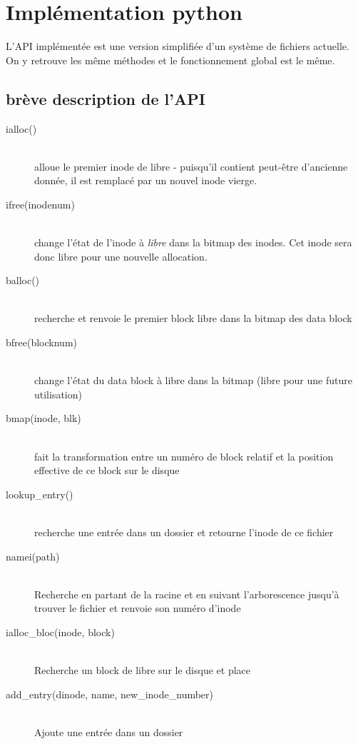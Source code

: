 \documentclass[a4paper,12pt]{article}
\begin{document}
\section{Implémentation python}

L'API implémentée est une version simplifiée d'un système de fichiers actuelle. On y retrouve les même méthodes et le fonctionnement global est le même.\\

\subsection{brève description de l'API}


\begin{description}
\item[ialloc()] \hfill \\
	alloue le premier inode de libre - puisqu'il contient peut-être d'ancienne donnée, il est remplacé par un nouvel inode vierge.
\item[ifree(inodenum)] \hfill \\
	change l'état de l'inode à \emph{libre} dans la bitmap des inodes. Cet inode sera donc libre pour une nouvelle allocation.
\item[balloc()] \hfill \\
	recherche et renvoie le premier block libre dans la bitmap des data block
\item[bfree(blocknum)] \hfill \\
	change l'état du data block à libre dans la bitmap (libre pour une future utilisation)
\item[bmap(inode, blk)] \hfill \\
	fait la transformation entre un numéro de block relatif et la position effective de ce block sur le disque
\item[lookup\_entry()] \hfill \\
	recherche une entrée dans un dossier et retourne l'inode de ce fichier
\item[namei(path)] \hfill \\
	Recherche en partant de la racine et en suivant l'arborescence jusqu'à trouver le fichier et renvoie son numéro d'inode
\item[ialloc\_bloc(inode, block)] \hfill \\
	Recherche un block de libre sur le disque et place 
\item[add\_entry(dinode, name, new\_inode\_number)] \hfill \\
	Ajoute une entrée dans un dossier
\end{description}
\end{document}
